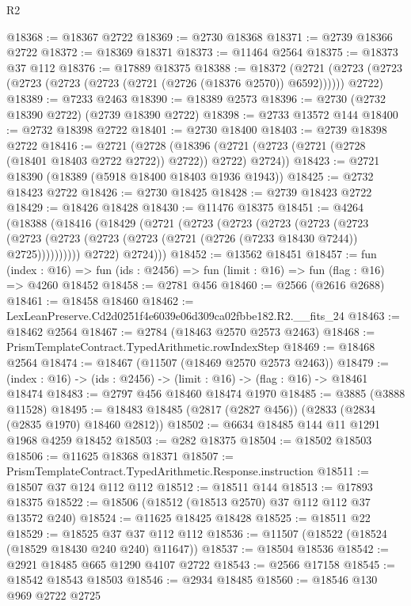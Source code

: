\begin{lexlean}{R2}
\begin{coremodule}
@18368 := @18367 @2722
@18369 := @2730 @18368
@18371 := @2739 @18366 @2722
@18372 := @18369 @18371
@18373 := @11464 @2564
@18375 := @18373 @37 @112
@18376 := @17889 @18375
@18388 := @18372
    (@2721 (@2723 (@2723 (@2723 (@2723 (@2723 (@2721 (@2726 (@18376 @2570)) @6592)))))) @2722)
@18389 := @7233 @2463
@18390 := @18389 @2573
@18396 := @2730 (@2732 @18390 @2722) (@2739 @18390 @2722)
@18398 := @2733 @13572 @144
@18400 := @2732 @18398 @2722
@18401 := @2730 @18400
@18403 := @2739 @18398 @2722
@18416 := @2721
    (@2728 (@18396 (@2721 (@2723 (@2721 (@2728 (@18401 @18403 @2722 @2722)) @2722)) @2722) @2724))
@18423 := @2721 @18390 (@18389 (@5918 @18400 @18403 @1936 @1943))
@18425 := @2732 @18423 @2722
@18426 := @2730 @18425
@18428 := @2739 @18423 @2722
@18429 := @18426 @18428
@18430 := @11476 @18375
@18451 := @4264
    (@18388
      (@18416
        (@18429
          (@2721
            (@2723
              (@2723
                (@2723
                  (@2723
                    (@2723
                      (@2723
                        (@2723 (@2723 (@2723 (@2721 (@2726 (@7233 @18430 @7244)) @2725))))))))))
            @2722)
          @2724)))
@18452 := @13562 @18451
@18457 := fun (index : @16) =>
  fun (ids : @2456) => fun (limit : @16) => fun (flag : @16) => @4260 @18452
@18458 := @2781 @456
@18460 := @2566 (@2616 @2688)
@18461 := @18458 @18460
@18462 := LexLeanPreserve.Cd2d0251f4e6039e06d309ca02fbbe182.R2.__fits_24
@18463 := @18462 @2564
@18467 := @2784 (@18463 @2570 @2573 @2463)
@18468 := PrismTemplateContract.TypedArithmetic.rowIndexStep
@18469 := @18468 @2564
@18474 := @18467 (@11507 (@18469 @2570 @2573 @2463))
@18479 := (index : @16) -> (ids : @2456) -> (limit : @16) -> (flag : @16) -> @18461 @18474
@18483 := @2797 @456 @18460 @18474 @1970
@18485 := @3885 (@3888 @11528)
@18495 := @18483 @18485 (@2817 (@2827 @456)) (@2833 (@2834 (@2835 @1970) @18460 @2812))
@18502 := @6634 @18485 @144 @11 @1291 @1968 @4259 @18452
@18503 := @282 @18375
@18504 := @18502 @18503
@18506 := @11625 @18368 @18371
@18507 := PrismTemplateContract.TypedArithmetic.Response.instruction
@18511 := @18507 @37 @124 @112 @112
@18512 := @18511 @144
@18513 := @17893 @18375
@18522 := @18506 (@18512 (@18513 @2570) @37 @112 @112 @37 @13572 @240)
@18524 := @11625 @18425 @18428
@18525 := @18511 @22
@18529 := @18525 @37 @37 @112 @112
@18536 := @11507 (@18522 (@18524 (@18529 @18430 @240 @240) @11647))
@18537 := @18504 @18536
@18542 := @2921 @18485 @665 @1290 @4107 @2722
@18543 := @2566 @17158
@18545 := @18542 @18543 @18503
@18546 := @2934 @18485
@18560 := @18546
    @130
    @969
    @2722
    @2725

\end{coremodule}
\end{lexlean}
